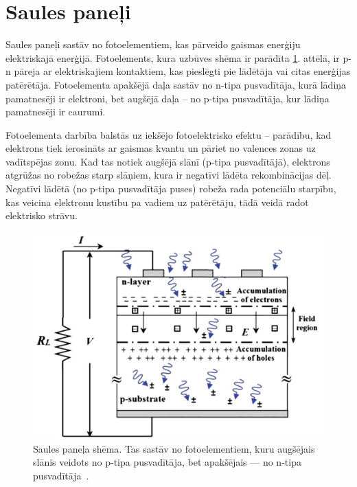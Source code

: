 \section{Saules paneļi}

Saules paneļi sastāv no fotoelementiem, kas pārveido gaismas enerģiju elektriskajā enerģijā. Fotoelements, kura uzbūves shēma ir parādīta \ref{fig:PV}. attēlā, ir p-n pāreja ar elektriskajiem kontaktiem, kas pieslēgti pie lādētāja vai citas enerģijas patērētāja. Fotoelementa apakšējā daļa sastāv no n-tipa pusvadītāja, kurā lādiņa pamatnesēji ir elektroni, bet augšējā daļa -- no p-tipa pusvadītāja, kur lādiņa pamatnesēji ir caurumi. 

Fotoelementa darbība balstās uz iekšējo fotoelektrisko efektu -- parādību, kad elektrons tiek ierosināts ar gaismas kvantu un pāriet no valences zonas uz vadītspējas zonu. Kad tas notiek augšējā slānī (p-tipa pusvadītājā), elektrons atgrūžas no robežas starp slāņiem, kura ir negatīvi lādēta rekombinācijas dēļ. Negatīvi lādētā (no p-tipa pusvadītāja puses) robeža rada potenciālu starpību, kas veicina elektronu kustību pa vadiem uz patērētāju, tādā veidā radot elektrisko strāvu.

\begin{figure}[h]
    \centering
    \includegraphics[width=0.6\linewidth]{figures/misc/PV.jpg}
    \caption{Saules paneļa shēma. Tas sastāv no fotoelementiem, kuru augšējais slānis veidots no p-tipa pusvadītāja, bet apakšējais --- no n-tipa pusvadītāja~\cite{Yahyaoui}.}
    \label{fig:PV}
\end{figure}

